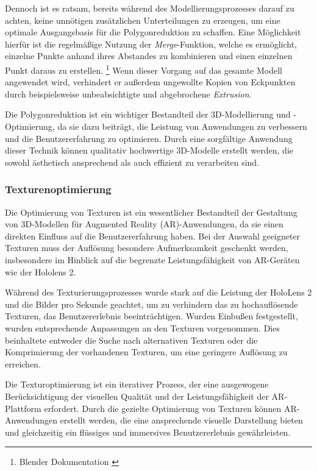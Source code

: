 Dennoch ist es ratsam, bereits während des Modellierungsprozesses darauf zu achten, keine unnötigen zusätzlichen Unterteilungen zu erzeugen, um eine optimale Ausgangsbasis für die Polygonreduktion zu schaffen. Eine Möglichkeit hierfür ist die regelmäßige Nutzung der \textit{Merge}-Funktion, welche es ermöglicht, einzelne Punkte anhand ihres Abstandes zu kombinieren und einen einzelnen Punkt daraus zu erstellen. \footnote{Blender Dokumentation \cite {Merge Funktion}} Wenn dieser Vorgang auf das gesamte Modell angewendet wird, verhindert er außerdem ungewollte Kopien von Eckpunkten durch beispielsweise unbeabsichtigte und abgebrochene \textit{Extrusion}.

Die Polygonreduktion ist ein wichtiger Bestandteil der 3D-Modellierung und -Optimierung, da sie dazu beiträgt, die Leistung von Anwendungen zu verbessern und die Benutzererfahrung zu optimieren. Durch eine sorgfältige Anwendung dieser Technik können qualitativ hochwertige 3D-Modelle erstellt werden, die sowohl ästhetisch ansprechend als auch effizient zu verarbeiten sind.

\subsubsection{Texturenoptimierung}
Die Optimierung von Texturen ist ein wesentlicher Bestandteil der Gestaltung von 3D-Modellen für Augmented Reality (AR)-Anwendungen, da sie einen direkten Einfluss auf die Benutzererfahrung haben. Bei der Auswahl geeigneter Texturen muss der Auflösung besondere Aufmerksamkeit geschenkt werden, insbesondere im Hinblick auf die begrenzte Leistungsfähigkeit von AR-Geräten wie der Hololens 2.

Während des Texturierungsprozesses wurde stark auf die Leistung der HoloLens 2 und die Bilder pro Sekunde geachtet, um zu verhindern das zu hochauflösende Texturen, das Benutzererlebnis beeinträchtigen. Wurden Einbußen festgestellt, wurden entsprechende Anpassungen an den Texturen vorgenommen. Dies beinhaltete entweder die Suche nach alternativen Texturen oder die Komprimierung der vorhandenen Texturen, um eine geringere Auflösung zu erreichen.

Die Texturoptimierung ist ein iterativer Prozess, der eine ausgewogene Berücksichtigung der visuellen Qualität und der Leistungsfähigkeit der AR-Plattform erfordert. Durch die gezielte Optimierung von Texturen können AR-Anwendungen erstellt werden, die eine ansprechende visuelle Darstellung bieten und gleichzeitig ein flüssiges und immersives Benutzererlebnis gewährleisten.

